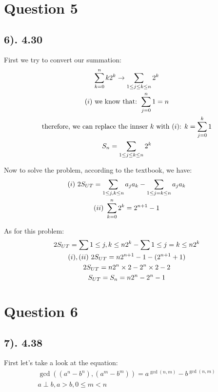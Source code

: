 \documentclass[12pt]{article}
\newcommand{\RNum}[1]{\uppercase\expandafter{\romannumeral #1\relax}}
\begin{document}
\section*{Question 5}
\subsection*{6). 4.30}
First we try to convert our summation:
\begin{gather*}
    \sum_{k=0}^n k2^k \to \sum_{1 \leq j \leq k \leq n } 2^k \\
    \text{($\RNum{1}$) we know that: } \sum_{j=0}^n 1 = n \\
    \text{therefore, we can replace the innser $k$ with ($\RNum{1}$): } k = \sum_{j=0}^k 1 \\
    S_{n} = \sum_{1 \leq j \leq k \leq n} 2^k
\end{gather*}

Now to solve the problem, according to the textbook, we have:
\begin{gather*}
    \text{$(\RNum{1})$ } 2S_{UT} = \sum_{1 \leq j,k \leq n} a_{j}a_{k} - \sum_{1 \leq j=k \leq n} a_{j}a_{k} \\
    \text{$(\RNum{2})$ } \sum_{k=0}^n 2^k = 2^{n+1} - 1
\end{gather*}

As for this problem:
\begin{gather*}
    2S_{UT} = \sum{1 \leq j,k \leq n} 2^k - \sum{1 \leq j=k \leq n} 2^k \\
    \text{$(\RNum{1}), (\RNum{2})$ } 2S_{UT} = n2^{n+1} - 1 - (2^{n+1} + 1) \\
    2S_{UT} = n2^{n} \times 2 - 2^n \times 2 - 2 \\
    S_{UT} = S_{n} = n2^{n} - 2^n - 1 
\end{gather*}

\section*{Question 6}
\subsection*{7). 4.38}
First let's take a look at the equation:
\begin{gather*}
    \gcd((a^n - b^n), (a^m - b^m)) = a^{\gcd(n,m)} - b^{\gcd(n,m)} \\
    a \perp b, a > b, 0 \leq m < n
\end{gather*}
\end{document}
